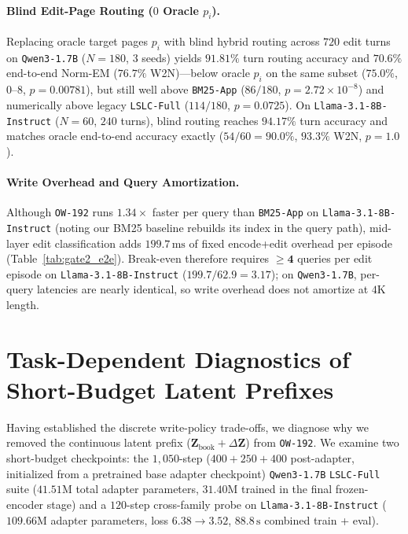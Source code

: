 \documentclass[11pt]{article}
\newcommand{\vect}[1]{\mathbf{#1}}
\renewcommand{\_}{\origunderscore\allowbreak}
\begin{document}
\paragraph{Blind Edit-Page Routing ($0$ Oracle $p_i$).}
Replacing oracle target pages $p_i$ with blind hybrid routing across $720$ edit turns on \texttt{Qwen3-1.7B} ($N=180$, $3$ seeds) yields $91.81\%$ turn routing accuracy and $70.6\%$ end-to-end Norm-EM ($76.7\%$ W2N)---below oracle $p_i$ on the same subset ($75.0\%$, $0$--$8$, $p=0.00781$), but still well above \texttt{BM25-App} ($86/180$, $p=2.72\times 10^{-8}$) and numerically above legacy \texttt{LSLC-Full} ($114/180$, $p=0.0725$). On \texttt{Llama-3.1-8B-Instruct} ($N=60$, $240$ turns), blind routing reaches $94.17\%$ turn accuracy and matches oracle end-to-end accuracy exactly ($54/60 = 90.0\%$, $93.3\%$ W2N, $p=1.0$).

\paragraph{Write Overhead and Query Amortization.}
Although \texttt{OW-192} runs $1.34\times$ faster per query than \texttt{BM25-App} on \texttt{Llama-3.1-8B-Instruct} (noting our BM25 baseline rebuilds its index in the query path), mid-layer edit classification adds $199.7\,\text{ms}$ of fixed encode+edit overhead per episode (Table~\ref{tab:gate2_e2e}). Break-even therefore requires $\mathbf{\ge 4}$ queries per edit episode on \texttt{Llama-3.1-8B-Instruct} ($199.7 / 62.9 = 3.17$); on \texttt{Qwen3-1.7B}, per-query latencies are nearly identical, so write overhead does not amortize at $4\text{K}$ length.

\section{Task-Dependent Diagnostics of Short-Budget Latent Prefixes}
\label{sec:diag}

Having established the discrete write-policy trade-offs, we diagnose why we removed the continuous latent prefix ($\vect{Z}_{\text{book}} + \Delta\vect{Z}$) from \texttt{OW-192}. We examine two short-budget checkpoints: the $1{,}050$-step ($400+250+400$ post-adapter, initialized from a pretrained base adapter checkpoint) \texttt{Qwen3-1.7B} \texttt{LSLC-Full} suite ($41.51\text{M}$ total adapter parameters, $31.40\text{M}$ trained in the final frozen-encoder stage) and a $120$-step cross-family probe on \texttt{Llama-3.1-8B-Instruct} ($109.66\text{M}$ adapter parameters, loss $6.38 \rightarrow 3.52$, $88.8\,\text{s}$ combined train + eval).
\end{document}
